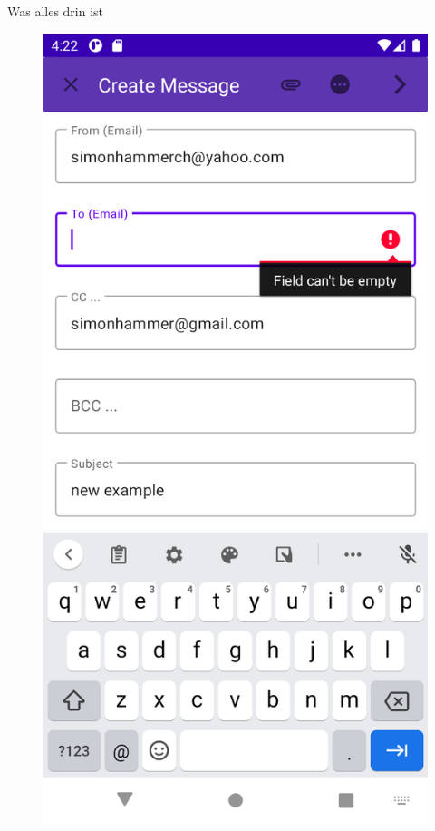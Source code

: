 \documentclass[aspectratio=169]{beamer}
\begin{document}
\begin{frame}[plain]{Was alles drin ist}
\begin{figure}[h]
        \pause
        \includegraphics[height=.7\textheight]{media/errorMessage.png}
        \pause

\end{figure}
\end{frame}
\end{document}
